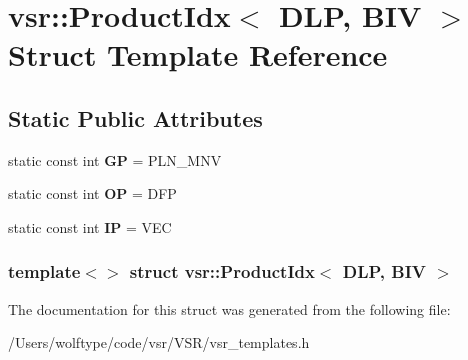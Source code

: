 \hypertarget{structvsr_1_1_product_idx_3_01_d_l_p_00_01_b_i_v_01_4}{\section{vsr\-:\-:Product\-Idx$<$ D\-L\-P, B\-I\-V $>$ Struct Template Reference}
\label{structvsr_1_1_product_idx_3_01_d_l_p_00_01_b_i_v_01_4}
}
\subsection*{Static Public Attributes}
\begin{DoxyCompactItemize}
\item 
\hypertarget{structvsr_1_1_product_idx_3_01_d_l_p_00_01_b_i_v_01_4_a5af9752309fa6d3bf341f908a87134ee}{static const int {\bfseries G\-P} = P\-L\-N\-\_\-\-M\-N\-V}\label{structvsr_1_1_product_idx_3_01_d_l_p_00_01_b_i_v_01_4_a5af9752309fa6d3bf341f908a87134ee}

\item 
\hypertarget{structvsr_1_1_product_idx_3_01_d_l_p_00_01_b_i_v_01_4_a2e780452d194a464949760ea46eab9b8}{static const int {\bfseries O\-P} = D\-F\-P}\label{structvsr_1_1_product_idx_3_01_d_l_p_00_01_b_i_v_01_4_a2e780452d194a464949760ea46eab9b8}

\item 
\hypertarget{structvsr_1_1_product_idx_3_01_d_l_p_00_01_b_i_v_01_4_a6f68da52c28741df433ff3eb42960d5a}{static const int {\bfseries I\-P} = V\-E\-C}\label{structvsr_1_1_product_idx_3_01_d_l_p_00_01_b_i_v_01_4_a6f68da52c28741df433ff3eb42960d5a}

\end{DoxyCompactItemize}
\subsubsection*{template$<$$>$ struct vsr\-::\-Product\-Idx$<$ D\-L\-P, B\-I\-V $>$}



The documentation for this struct was generated from the following file\-:\begin{DoxyCompactItemize}
\item 
/\-Users/wolftype/code/vsr/\-V\-S\-R/vsr\-\_\-templates.\-h\end{DoxyCompactItemize}

